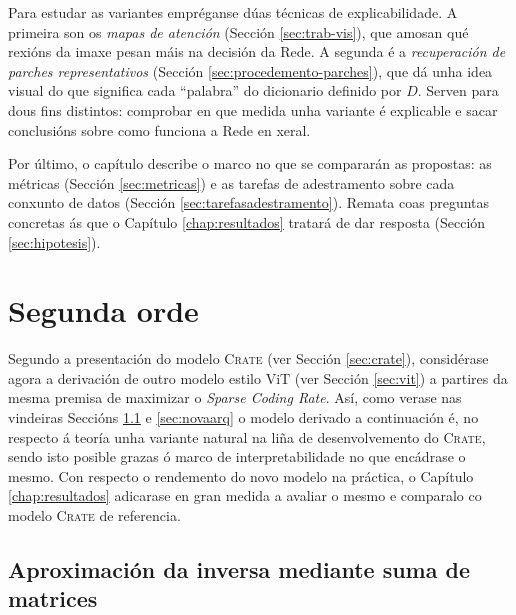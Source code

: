 Para estudar as variantes empréganse dúas técnicas de \gls{explicabilidade}. A primeira son os \emph{mapas de atención} (Sección \ref{sec:trab-vis}), que amosan qué rexións da imaxe pesan máis na decisión da Rede. A segunda é a \emph{recuperación de parches representativos} (Sección \ref{sec:procedemento-parches}), que dá unha idea visual do que significa cada ``palabra'' do dicionario definido por $D$. Serven para dous fins distintos: comprobar en que medida unha variante é explicable e sacar conclusións sobre como funciona a Rede en xeral.

Por último, o capítulo describe o marco no que se compararán as propostas: as métricas (Sección \ref{sec:metricas}) e as tarefas de adestramento sobre cada conxunto de datos (Sección \ref{sec:tarefasadestramento}). Remata coas preguntas concretas ás que o Capítulo \ref{chap:resultados} tratará de dar resposta (Sección \ref{sec:hipotesis}).

\section{Segunda orde}
\label{sec:segundo_orde}

Segundo a presentación do modelo \textsc{Crate} (ver Sección \ref{sec:crate}), considérase agora a derivación de outro modelo estilo ViT (ver Sección \ref{sec:vit}) a partires da mesma premisa de maximizar o \emph{Sparse Coding Rate}. Así, como verase nas vindeiras Seccións \ref{sec:aproximacion_inversa} e \ref{sec:novaarq} o modelo derivado a continuación é, no respecto á teoría unha variante natural na liña de desenvolvemento do \textsc{Crate}, sendo isto posible grazas ó marco de \gls{interpretabilidade} no que encádrase o mesmo. Con respecto o rendemento do novo modelo na práctica, o Capítulo \ref{chap:resultados} adicarase en gran medida a avaliar o mesmo e comparalo co modelo \textsc{Crate} de referencia.

\subsection{Aproximación da inversa mediante suma de matrices}
\label{sec:aproximacion_inversa}

